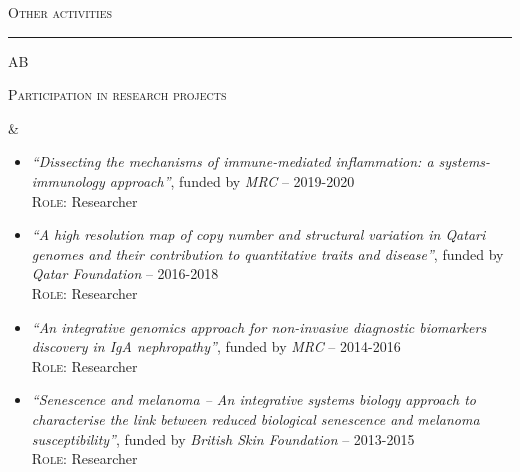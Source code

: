 \documentclass[a4paper,10pt]{article}
\newcommand{\mediumtitle}[1]{
	\vspace{0.2cm}
	{\noindent
	\Large \textsc{#1}\\[-2ex]
	\hrule
	\vspace{0.2cm}}
}
\newenvironment{doubletablelist}
{
	\vspace{-0.2cm}
	\begin{longtable}[!h]{AB}}{\end{longtable}
}
\newcommand{\dtlist}[2]{
\hspace{-3cm}
\noindent
	\begin{minipage}{0.24\textwidth}
	\begin{flushright}
	\textsc{#1}
	\end{flushright}
	\end{minipage}
	& #2\\[0.2cm]
}
\newcommand{\minusitem}{\item[-]}
\begin{document}


\mediumtitle{Other activities}


\begin{doubletablelist}
\dtlist{Participation in research projects}{
	\vspace{-0.8cm}
	\begin{itemize} %
		\minusitem  \begin{minipage}{0.65\textwidth}
			\emph{``Dissecting the mechanisms of immune-mediated inflammation: a systems-immunology approach''}, funded by \emph{MRC} -- 2019-2020\\
			\textsc{Role:} Researcher
		\end{minipage}
		\minusitem  \begin{minipage}{0.65\textwidth}
			\emph{``A high resolution map of copy number and structural variation in Qatari genomes and their contribution to quantitative traits and disease''}, funded by \emph{Qatar Foundation} -- 2016-2018\\
			\textsc{Role:} Researcher
		\end{minipage}
		\minusitem  \begin{minipage}{0.65\textwidth}
			\emph{``An integrative genomics approach for non-invasive diagnostic biomarkers discovery in IgA nephropathy''}, funded by \emph{MRC} -- 2014-2016\\
			\textsc{Role:} Researcher
		\end{minipage}
		\minusitem  \begin{minipage}{0.65\textwidth}
			\emph{``Senescence and melanoma -- An integrative systems biology approach to characterise the link between reduced biological senescence and melanoma susceptibility''}, funded by \emph{British Skin Foundation} -- 2013-2015\\
			\textsc{Role:} Researcher
		\end{minipage}
		
	\end{itemize}
}
\end{doubletablelist}
	
\end{document}
